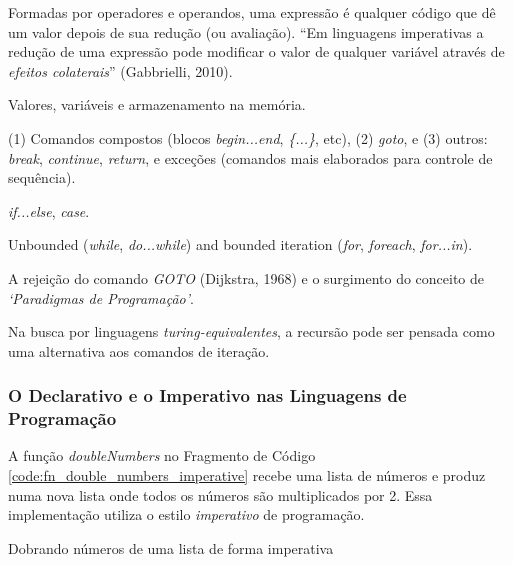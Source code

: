 {\tiny
\begin{description}[noitemsep]
\item[Expressões] Formadas por operadores e operandos, uma expressão é qualquer
  código que dê um valor depois de sua redução (ou avaliação). ``Em linguagens
  imperativas a redução de uma expressão pode modificar o valor de qualquer
  variável através de \emph{efeitos colaterais}'' (Gabbrielli, 2010).
\item[Comandos]
  \begin{description}[noitemsep]
  \item[Atribuição] Valores, variáveis e armazenamento na memória.
  \item[Comandos de controle explícito] (1) Comandos compostos (blocos
    \emph{begin...end}, \emph{\{...\}}, etc), (2) \emph{goto}, e (3) outros:
    \emph{break}, \emph{continue}, \emph{return}, e exceções (comandos mais
    elaborados para controle de sequência).
  \item[Comandos Condicionais] \emph{if...else}, \emph{case}.
  \item[Comandos Iterativos] Unbounded (\emph{while}, \emph{do...while}) and
    bounded iteration (\emph{for}, \emph{foreach}, \emph{for...in}).
  \item[Programação Estruturada] A rejeição do comando \emph{GOTO} (Dijkstra,
    1968) e o surgimento do conceito de \emph{‘Paradigmas de Programação’}.
  \item[Recursão] Na busca por linguagens \emph{turing-equivalentes}, a recursão
    pode ser pensada como uma alternativa aos comandos de iteração.
  \end{description}
\end{description}
}

\subsubsection{O Declarativo e o Imperativo nas Linguagens de Programação}
\label{sec:dec_vs_imp}


A função \emph{doubleNumbers} no Fragmento de Código
\ref{code:fn_double_numbers_imperative} recebe uma lista de números e produz numa nova
lista onde todos os números são multiplicados por 2. Essa implementação utiliza
o estilo \emph{imperativo} de programação.

\begin{listing}[H]
  \centering
  \caption{Dobrando números de uma lista de forma imperativa}
  \inputminted{js}{code/fn_double_numbers_imperative.js}
  \label{code:fn_double_numbers_imperative}
\end{listing}


